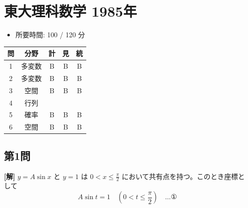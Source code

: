 \documentclass[../main.tex]{subfiles}
\begin{document}
\section*{東大理科数学 1985年}

\begin{itemize}
  \item 所要時間: 100 / 120 分
\end{itemize}

\begin{center}
  \begin{tabular}{|c|c|c|c|c|}
    \hline
    問 & 分野 & 計 & 見 & 統 \\ \hline
    1 & 多変数 & B & B & B \\ \hline
    2 & 多変数 & B & B & B \\ \hline
    3 & 空間 & B & B & B \\ \hline
    4 & 行列 & & & \\ \hline
    5 & 確率 & B & B & B \\ \hline
    6 & 空間 & B & B & B \\ \hline
  \end{tabular}
\end{center}

\newpage

\subsection*{第1問}

\noindent
\textbf{[解]} $y = A \sin x$ と $y = 1$ は $0 < x \le \frac{\pi}{2}$ において共有点を持つ。このとき座標として
\[
  A \sin t = 1 \quad \left(0 < t \le \frac{\pi}{2}\right) \quad \dots \text{①}
\]
\end{document}
